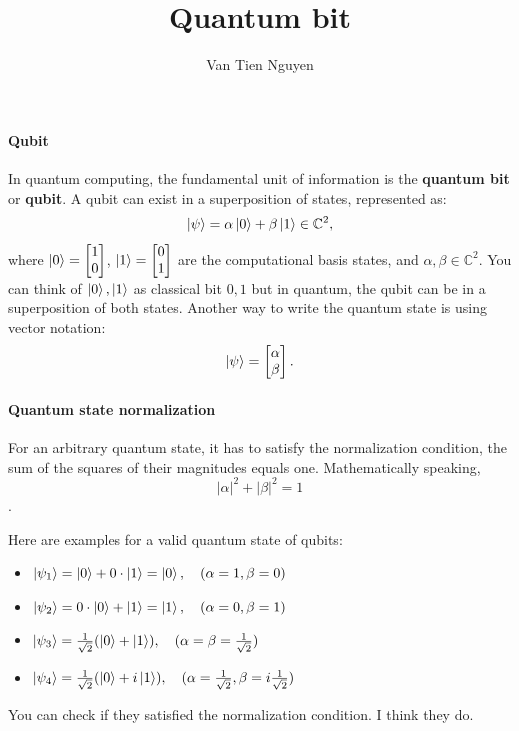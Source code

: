 \documentclass[10pt,article]{IEEEtran}
\title{Quantum bit}
\author{Van Tien Nguyen}
\begin{document}
\maketitle

\paragraph{Qubit}
In quantum computing, the fundamental unit of information is the \textbf{quantum bit} or \textbf{qubit}. A qubit can exist in a superposition of states, represented as:
\begin{equation}
  \ket{\psi} = \alpha\ket{0} + \beta\ket{1} \in \mathbb{C}^2,
  \label{eq:qubit_state}
\end{equation}
where \(\ket{0} = \begin{bmatrix} 1 \\ 0 \end{bmatrix}\), \(\ket{1} = \begin{bmatrix} 0 \\ 1 \end{bmatrix}\) are the computational basis states, and \(\alpha, \beta \in \mathbb{C}^2\). You can think of \(\ket{0}, \ket{1}\) as classical bit \(0, 1\) but in quantum, the qubit can be in a superposition of both states. Another way to write the quantum state is using vector notation:
\begin{equation}
    \ket{\psi} = \begin{bmatrix}
        \alpha\\
        \beta
    \end{bmatrix}.
\end{equation}

\paragraph{Quantum state normalization}
For an arbitrary quantum state, it has to satisfy the normalization condition, the sum of the squares of their magnitudes equals one. Mathematically speaking,
\begin{equation}
    |\alpha|^2 + |\beta|^2 = 1
    \label{eq:normalized_condition}
\end{equation}.

Here are examples for a valid quantum state of qubits:

\begin{itemize}
    \item \(\ket{\psi_1} = \ket{0} + 0\cdot\ket{1} = \ket{0}, \quad (\alpha = 1, \beta = 0)\)
    \item \(\ket{\psi_2} = 0\cdot\ket{0} +\ket{1} = \ket{1},  \quad (\alpha = 0, \beta = 1)\)
    \item \(\ket{\psi_3} = \frac{1}{\sqrt{2}}(\ket{0} + \ket{1}),  \quad (\alpha = \beta = \frac{1}{\sqrt{2}})\)
    \item \(\ket{\psi_4} = \frac{1}{\sqrt{2}}(\ket{0} + i\ket{1}),  \quad (\alpha = \frac{1}{\sqrt{2}}, \beta = i\frac{1}{\sqrt{2}})\)
\end{itemize}
You can check if they satisfied the normalization condition. I think they do.
\end{document}
